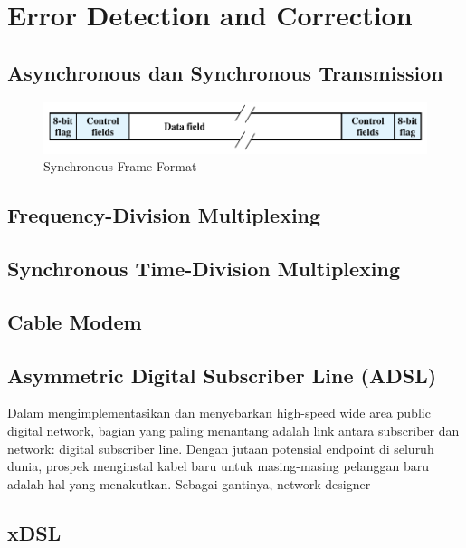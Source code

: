 \chapter{Error Detection and Correction}\label{ch:06}

\section{Asynchronous dan Synchronous Transmission}

\begin{figure}
	\centering
	\includegraphics[width=0.7\linewidth]{gambar/fig:06.02}
	\caption{Synchronous Frame Format}
	\label{fig:06.02}
\end{figure}


\section{Frequency-Division Multiplexing}

\section{Synchronous Time-Division Multiplexing}

\section{Cable Modem}

\section{Asymmetric Digital Subscriber Line (ADSL)}

Dalam mengimplementasikan dan menyebarkan high-speed wide area public digital network, bagian yang paling menantang adalah link antara subscriber dan network: digital subscriber line. Dengan jutaan potensial endpoint di seluruh dunia, prospek menginstal kabel baru untuk masing-masing pelanggan baru adalah hal yang menakutkan. Sebagai gantinya, network designer


\section{xDSL}